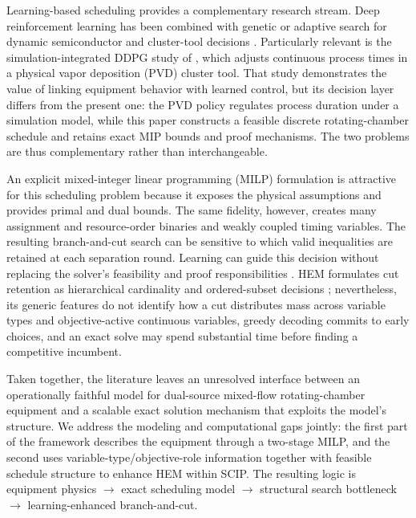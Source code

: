 \documentclass[preprint,12pt,authoryear]{elsarticle}
\begin{document}
Learning-based scheduling provides a complementary research stream.
Deep reinforcement learning has been combined with genetic or adaptive search
for dynamic semiconductor and cluster-tool decisions
\citep{chien2021drlhga,liu2022cnna3c,zhang2024qeda,
kim2025adaptivecluster,kim2025noncyclic}. Particularly relevant is the
simulation-integrated DDPG study of \citet{hong2026ddpgct}, which adjusts
continuous process times in a physical vapor deposition (PVD) cluster tool.
That study demonstrates the value of linking equipment behavior with learned
control, but its decision layer differs from the present one: the PVD policy
regulates process duration under a simulation model, while this paper
constructs a feasible discrete rotating-chamber schedule and retains exact MIP bounds and
proof mechanisms. The two problems are thus complementary rather than
interchangeable.

An explicit mixed-integer linear programming (MILP) formulation is attractive
for this scheduling problem because it exposes the physical assumptions and provides
primal and dual bounds. The same fidelity, however, creates many assignment
and resource-order binaries and weakly coupled timing variables. The resulting
branch-and-cut search can be sensitive to which valid inequalities are
retained at each separation round. Learning can guide this decision without
replacing the solver's feasibility and proof responsibilities
\citep{bengio2021machine,scavuzzo2024mlbb}. HEM formulates cut retention as
hierarchical cardinality and ordered-subset decisions
\citep{wang2023hem,wang2024hemtpami}; nevertheless, its generic features do
not identify how a cut distributes mass across variable types and
objective-active continuous variables, greedy
decoding commits to early choices, and an exact solve may spend substantial
time before finding a competitive incumbent.

Taken together, the literature leaves an unresolved interface between an
operationally faithful model for dual-source mixed-flow rotating-chamber equipment and a
scalable exact solution mechanism that exploits the model's structure. We
address the modeling and computational gaps jointly: the first part of the
framework describes the equipment through a two-stage MILP, and the second
uses variable-type/objective-role information together with feasible schedule
structure to enhance HEM within SCIP. The resulting logic is
equipment physics $\rightarrow$ exact scheduling model $\rightarrow$ structural
search bottleneck $\rightarrow$ learning-enhanced branch-and-cut.
\end{document}
